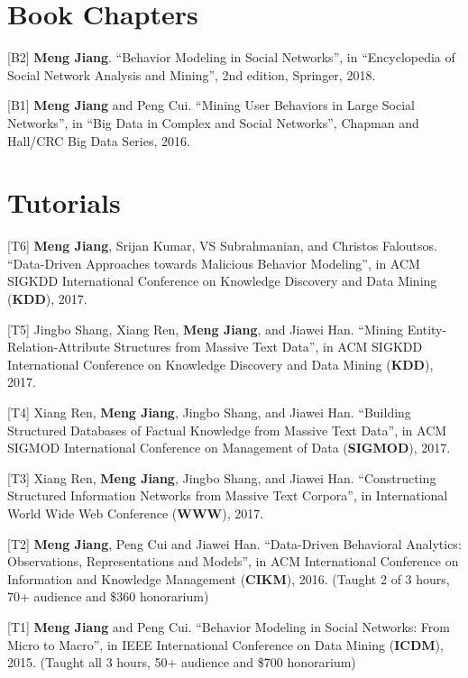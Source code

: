 \documentclass[margin, 9pt]{res}
\begin{document}
\begin{resume}
\section{Book Chapters}

[B2] \textbf{Meng Jiang}. ``Behavior Modeling in Social Networks'', in ``Encyclopedia of Social Network Analysis and Mining'', 2nd edition, Springer, 2018.

[B1] \textbf{Meng Jiang} and Peng Cui. ``Mining User Behaviors in Large Social Networks'', in ``Big Data in Complex and Social Networks'', Chapman and Hall/CRC Big Data Series, 2016.


\section{Tutorials}

[T6] \textbf{Meng Jiang}, Srijan Kumar, VS Subrahmanian, and Christos Faloutsos. ``Data-Driven Approaches towards Malicious Behavior Modeling'', in ACM SIGKDD International Conference on Knowledge Discovery and Data Mining (\textbf{KDD}), 2017.

[T5] Jingbo Shang, Xiang Ren, \textbf{Meng Jiang}, and Jiawei Han. ``Mining Entity-Relation-Attribute Structures from Massive Text Data'', in ACM SIGKDD International Conference on Knowledge Discovery and Data Mining (\textbf{KDD}), 2017.

[T4] Xiang Ren, \textbf{Meng Jiang}, Jingbo Shang, and Jiawei Han. ``Building Structured Databases of Factual Knowledge from Massive Text Data'', in ACM SIGMOD International Conference on Management of Data (\textbf{SIGMOD}), 2017.

[T3] Xiang Ren, \textbf{Meng Jiang}, Jingbo Shang, and Jiawei Han. ``Constructing Structured Information Networks from Massive Text Corpora'', in International World Wide Web Conference (\textbf{WWW}), 2017.

[T2] \textbf{Meng Jiang}, Peng Cui and Jiawei Han. ``Data-Driven Behavioral Analytics: Observations, Representations and Models'', in ACM International Conference on Information and Knowledge Management (\textbf{CIKM}), 2016. (Taught 2 of 3 hours, 70+ audience and \$360 honorarium)

[T1] \textbf{Meng Jiang} and Peng Cui. ``Behavior Modeling in Social Networks: From Micro to Macro'', in IEEE International Conference on Data Mining (\textbf{ICDM}), 2015. (Taught all 3 hours, 50+ audience and \$700 honorarium)


\end{resume}
\end{document}
